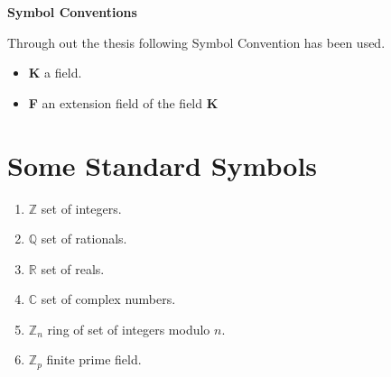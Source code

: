 
\hspace{-7mm}
  {\LARGE {\bfseries {Symbol Conventions}}}

  \vspace{7mm}

Through out the thesis following Symbol Convention has been used.\\[4mm]

\begin{itemize}
\item \textbf{K} \hspace{5mm} a field.
\item \textbf{F} \hspace{5mm} an extension field of the field \textbf{K}
\end{itemize}

\section*{Some Standard Symbols}
\begin{enumerate}
\item \(\mathbb{Z}\) \hspace{5mm} set of integers.
\item \(\mathbb{Q}\) \hspace{5mm} set of rationals.
\item \(\mathbb{R}\) \hspace{5mm} set of reals.
\item \(\mathbb{C}\) \hspace{5mm} set of complex numbers.
\item \(\mathbb{Z}_n\) \hspace{5mm} ring of set of integers modulo \(n\).
\item \(\mathbb{Z}_p\) \hspace{5mm} finite prime field.
\end{enumerate}
\clearpage
